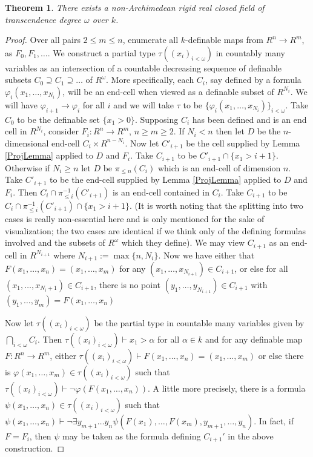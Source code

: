 \documentclass{article}
\newtheorem{theorem}{Theorem}[section]
\theoremstyle{remark}
\theoremstyle{definition}
\theoremstyle{definition}
\theoremstyle{definition}
\theoremstyle{definition}
\begin{document}
\begin{theorem}\label{InfiniteThm}
    There exists a non-Archimedean rigid real closed field of transcendence degree $\omega$ over $k$.
\end{theorem}
\begin{proof}
    Over all pairs $2\leq m\leq n$, enumerate all $k$-definable maps from $R^n\to R^m$, as $F_0,F_1,\dots$. We construct a partial type $\tau((x_i)_{i<\omega})$ in countably many variables as an intersection of a countable decreasing sequence of definable subsets $C_0\supseteq C_1\supseteq\dots$ of $R^\omega$. More specifically, each $C_i$, say defined by a formula $\varphi_i(x_1,\dots,x_{N_i})$, will be an end-cell when viewed as a definable subset of $R^{N_i}$. We will have $\varphi_{i+1}\to\varphi_{i}$ for all $i$ and we will take $\tau$ to be $\{\varphi_i(x_1,\dots,x_{N_i})\}_{i<\omega}$. Take $C_0$ to be the definable set $\{x_1>0\}$. Supposing $C_i$ has been defined and is an end cell in $R^{N_i
    }$, consider $F_i:R^n\to R^m$, $n\geq m\geq 2$. If $N_i<n$ then let $D$ be the $n$-dimensional end-cell $C_i\times R^{n-N_i}$. Now let $C'_{i+1}$ be the cell supplied by Lemma \ref{ProjLemma} applied to $D$ and $F_i$. Take $C_{i+1}$ to be $C'_{i+1}\cap \{x_1>i+1\}$. Otherwise if $N_i\geq n$ let $D$ be $\pi_{\leq n}(C_i)$ which is an end-cell of dimension $n$. Take $C'_{i+1}$ to be the end-cell supplied by Lemma \ref{ProjLemma} applied to $D$ and $F_i$. Then $C_i\cap \pi^{-1}_{\leq i}(C'_{i+1})$ is an end-cell contained in $C_i$. Take $C_{i+1}$ to be $C_i\cap \pi^{-1}_{\leq i}(C'_{i+1})\cap\{x_1>i+1\}$. (It is worth noting that the splitting into two cases is really non-essential here and is only mentioned for the sake of visualization; the two cases are identical if we think only of the defining formulas involved and the subsets of $R^\omega$ which they define). We may view $C_{i+1}$ as an end-cell in $R^{N_{i+1}}$ where $N_{i+1}:=\max\{n,N_i\}$. Now we have either that $F(x_1,\dots,x_n)=(x_1,\dots,x_m)$ for any $(x_1,\dots, x_{N_{i+1}})\in C_{i+1}$, or else for all $(x_1,\dots, x_{N_i+1})\in C_{i+1}$, there is no point $(y_1,\dots,y_{N_{i+1}})\in C_{i+1}$ with $(y_1,\dots,y_m)=F(x_1,\dots,x_n)$
    
    Now let $\tau((x_i)_{i<\omega})$ be the partial type in countable many variables given by $\bigcap_{i<\omega} C_i$. Then $\tau((x_i)_{i<\omega})\vdash x_1>\alpha$ for all $\alpha\in k$ and for any definable map $F:R^n\to R^m$, either $\tau((x_i)_{i<\omega})\vdash F(x_1,\dots,x_n)=(x_1,\dots,x_m)$ or else there is $\varphi(x_1,\dots,x_m)\in \tau((x_i)_{i<\omega})$ such that $\tau((x_i)_{i<\omega})\vdash \lnot\varphi(F(x_1,\dots,x_n))$. A little more precisely, there is a formula $\psi(x_1,\dots,x_n)\in\tau((x_i)_{i<\omega})$ such that $\psi(x_1,\dots,x_n)\vdash \lnot \exists y_{m+1}\dots y_n\psi(F(x_1),\dots,F(x_m),y_{m+1},\dots,y_n)$. In fact, if $F=F_i$, then $\psi$ may be taken as the formula defining $C_{i+1}'$ in the above construction.


\end{proof}
\end{document}
